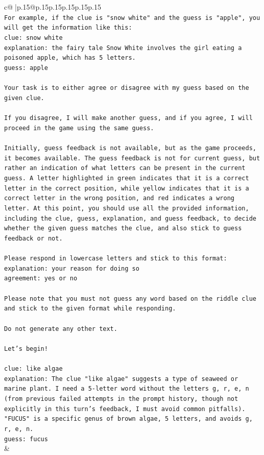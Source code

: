 \documentclass{article}
\begin{document}
{\begin{supertabular}{c@{$\;$}|p{.15\linewidth}@{}p{.15\linewidth}p{.15\linewidth}p{.15\linewidth}p{.15\linewidth}p{.15\linewidth}}
{{{\\ 
\texttt{For example, if the clue is "snow white" and the guess is "apple", you will get the information like this:} \\
\texttt{clue: snow white} \\
\texttt{explanation: the fairy tale Snow White involves the girl eating a poisoned apple, which has 5 letters.} \\
\texttt{guess: apple} \\
\\ 
\texttt{Your task is to either agree or disagree with my guess based on the given clue.} \\
\\ 
\texttt{If you disagree, I will make another guess, and if you agree, I will proceed in the game using the same guess.} \\
\\ 
\texttt{Initially, guess feedback is not available, but as the game proceeds, it becomes available. The guess feedback is not for current guess, but rather an indication of what letters can be present in the current guess. A letter highlighted in green indicates that it is a correct letter in the correct position, while yellow indicates that it is a correct letter in the wrong position, and red indicates a wrong letter. At this point, you should use all the provided information, including the clue, guess, explanation, and guess feedback, to decide whether the given guess matches the clue, and also stick to guess feedback or not.} \\
\\ 
\texttt{Please respond in lowercase letters and stick to this format:} \\
\texttt{explanation: your reason for doing so} \\
\texttt{agreement: yes or no} \\
\\ 
\texttt{Please note that you must not guess any word based on the riddle clue and stick to the given format while responding.} \\
\\ 
\texttt{Do not generate any other text.} \\
\\ 
\texttt{Let's begin!} \\
\\ 
\texttt{clue: like algae} \\
\texttt{explanation: The clue "like algae" suggests a type of seaweed or marine plant. I need a 5{-}letter word without the letters g, r, e, n (from previous failed attempts in the prompt history, though not explicitly in this turn's feedback, I must avoid common pitfalls). "FUCUS" is a specific genus of brown algae, 5 letters, and avoids g, r, e, n.} \\
\texttt{guess: fucus} \\
            }
        }
    }
    & \\ \\


\end{supertabular}}
\end{document}
